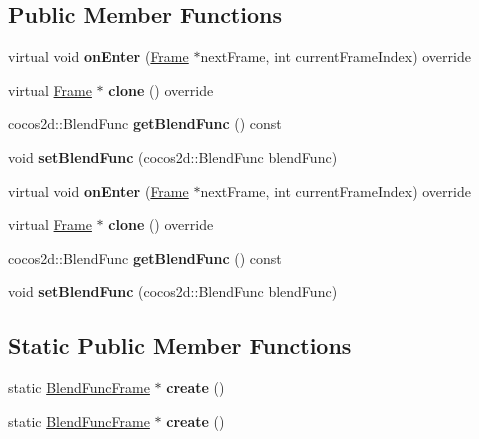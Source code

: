 \subsection*{Public Member Functions}
\begin{DoxyCompactItemize}
\item 
\mbox{\label{classBlendFuncFrame_ab2d647f8be7b0d457577480e4e125b57}} 
virtual void {\bfseries on\+Enter} (\hyperlink{classFrame}{Frame} $\ast$next\+Frame, int current\+Frame\+Index) override
\item 
\mbox{\label{classBlendFuncFrame_a34d1a2fa748d093e6593a3be011fa33f}} 
virtual \hyperlink{classFrame}{Frame} $\ast$ {\bfseries clone} () override
\item 
\mbox{\label{classBlendFuncFrame_a81603f255c9a98c21f21036f0069f222}} 
cocos2d\+::\+Blend\+Func {\bfseries get\+Blend\+Func} () const
\item 
\mbox{\label{classBlendFuncFrame_ab0e200c6c0841a54aa637538642b8ca1}} 
void {\bfseries set\+Blend\+Func} (cocos2d\+::\+Blend\+Func blend\+Func)
\item 
\mbox{\label{classBlendFuncFrame_abdba75f2dab40ad127c321f8d51b4cd1}} 
virtual void {\bfseries on\+Enter} (\hyperlink{classFrame}{Frame} $\ast$next\+Frame, int current\+Frame\+Index) override
\item 
\mbox{\label{classBlendFuncFrame_a5fd97d659398ac74e48c1d26a7cdf830}} 
virtual \hyperlink{classFrame}{Frame} $\ast$ {\bfseries clone} () override
\item 
\mbox{\label{classBlendFuncFrame_a81603f255c9a98c21f21036f0069f222}} 
cocos2d\+::\+Blend\+Func {\bfseries get\+Blend\+Func} () const
\item 
\mbox{\label{classBlendFuncFrame_ab0e200c6c0841a54aa637538642b8ca1}} 
void {\bfseries set\+Blend\+Func} (cocos2d\+::\+Blend\+Func blend\+Func)
\end{DoxyCompactItemize}
\subsection*{Static Public Member Functions}
\begin{DoxyCompactItemize}
\item 
\mbox{\label{classBlendFuncFrame_af1e9e1f4602d1ee377afca4e7e4dafac}} 
static \hyperlink{classBlendFuncFrame}{Blend\+Func\+Frame} $\ast$ {\bfseries create} ()
\item 
\mbox{\label{classBlendFuncFrame_a1781a5439f451e8250b3573ed06641ef}} 
static \hyperlink{classBlendFuncFrame}{Blend\+Func\+Frame} $\ast$ {\bfseries create} ()
\end{DoxyCompactItemize}
